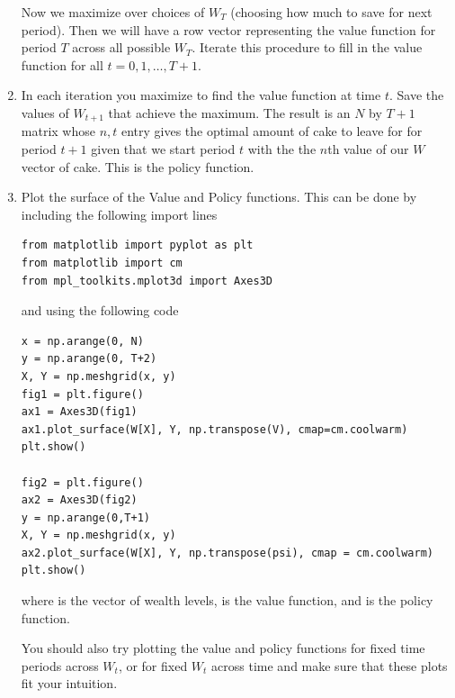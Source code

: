 \begin{problem}
\begin{enumerate}
Now we maximize over choices of $W_T$ (choosing how much to save for next period).  Then we will have a row vector representing the value function for period $T$ across all possible $W_T$.  Iterate this procedure to fill in the value function for all $t=0,1,\ldots, T+1$.

\item In each iteration you maximize to find the value function at time $t$.  Save the values of $W_{t+1}$ that achieve the maximum.  The result is an $N$ by $T+1$ matrix whose $n,t$ entry gives the optimal amount of cake to leave for for period $t+1$ given that we start period $t$ with the the $n$th value of our $W$ vector of cake.  This is the policy function.

\item Plot the surface of the Value and Policy functions.  This can be done by including the following import lines
\begin{lstlisting}
from matplotlib import pyplot as plt
from matplotlib import cm
from mpl_toolkits.mplot3d import Axes3D
\end{lstlisting}
and using the following code
\begin{lstlisting}
x = np.arange(0, N)
y = np.arange(0, T+2)
X, Y = np.meshgrid(x, y)
fig1 = plt.figure()
ax1 = Axes3D(fig1)
ax1.plot_surface(W[X], Y, np.transpose(V), cmap=cm.coolwarm)
plt.show()

fig2 = plt.figure()
ax2 = Axes3D(fig2)
y = np.arange(0,T+1)
X, Y = np.meshgrid(x, y)
ax2.plot_surface(W[X], Y, np.transpose(psi), cmap = cm.coolwarm)
plt.show()
\end{lstlisting}
where  is the vector of wealth levels,  is the value function, and  is the policy function.

You should also try plotting the value and policy functions for fixed time periods across $W_t$, or for fixed $W_t$ across time and make sure that these plots fit your intuition.
\end{enumerate}
\end{problem}

